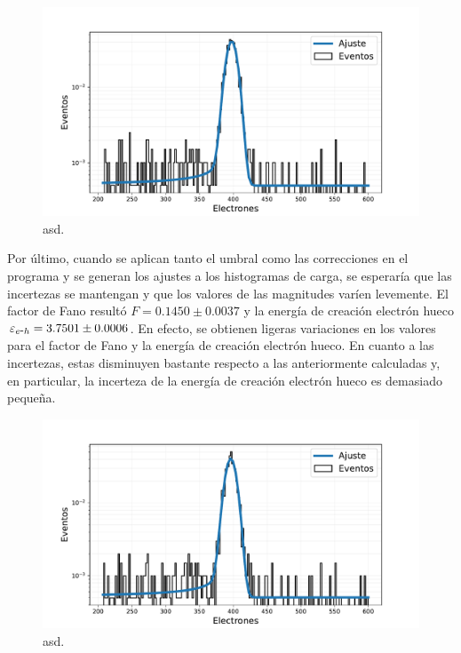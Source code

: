 \begin{figure}[H]
    \centering
        \includegraphics[scale=0.5]{Figs/HistFit_100c_EPIX15_OHDU1_SinCorr.pdf}
    \caption{\footnotesize{asd.}}
    \label{fig:Al_OHDU1_EPIX15_SinCorr}
\end{figure}
Por último, cuando se aplican tanto el umbral como las correcciones en el programa y se generan los ajustes a los histogramas de carga, se esperaría que las incertezas se mantengan y que los valores de las magnitudes varíen levemente. El factor de Fano resultó $F = 0.1450 \pm 0.0037$ y la energía de creación electrón hueco $\varepsilon_{e\mbox{-}h} = 3.7501 \pm 0.0006$. En efecto, se obtienen ligeras variaciones en los valores para el factor de Fano y la energía de creación electrón hueco. En cuanto a las incertezas, estas disminuyen bastante respecto a las anteriormente calculadas y, en particular, la incerteza de la energía de creación electrón hueco es demasiado pequeña.
\begin{figure}[H]
    \centering
        \includegraphics[scale=0.5]{Figs/HistFit_100c_EPIX15_OHDU1_Corr.pdf}
    \caption{\footnotesize{asd.}}
    \label{fig:Al_OHDU1_EPIX15_Corr}
\end{figure}
